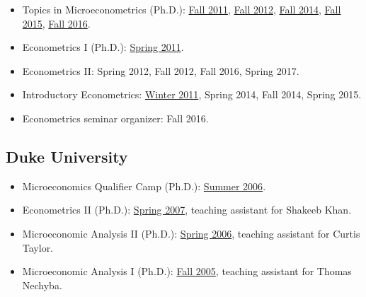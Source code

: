 \documentclass[10pt,letterpaper]{article}
\begin{document}
\begin{itemize}
\item Topics in Microeconometrics (Ph.D.):
  \href{http://jblevins.org/courses/econ843f11/}{Fall 2011}, %
  \href{http://jblevins.org/courses/econ8833f12/}{Fall 2012}, %
  \href{http://jblevins.org/courses/econ8833f14/}{Fall 2014}, %
  \href{http://jblevins.org/courses/econ8833f15/}{Fall 2015}, %
  \href{http://jblevins.org/courses/econ8833f16/}{Fall 2016}. %
\item Econometrics I (Ph.D.):
  \href{http://jblevins.org/courses/econ741s11/}{Spring 2011}. %
\item Econometrics II:
  Spring 2012, %
  Fall 2012, %
  Fall 2016, %
  Spring 2017. %
\item Introductory Econometrics:
  \href{http://jblevins.org/courses/econ444w11/}{Winter 2011}, %
  Spring 2014, %
  Fall 2014, %
  Spring 2015. %
\item Econometrics seminar organizer:
  Fall 2016.
\end{itemize}

\subsection*{Duke University}

\begin{itemize}
\item Microeconomics Qualifier Camp (Ph.D.):
  \href{http://jblevins.org/courses/qualcamp06/}{Summer 2006}.
\item Econometrics II (Ph.D.):
  \href{http://jblevins.org/courses/econ342s07/}{Spring 2007}, teaching assistant for Shakeeb Khan.
\item Microeconomic Analysis II (Ph.D.):
  \href{http://jblevins.org/courses/econ302s06/}{Spring 2006}, teaching assistant for Curtis Taylor.
\item Microeconomic Analysis I (Ph.D.):
  \href{http://jblevins.org/courses/econ301f05/}{Fall 2005}, teaching assistant for Thomas Nechyba.
\end{itemize}
\end{document}

